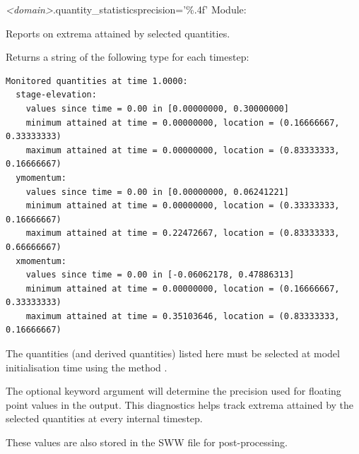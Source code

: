 \documentclass{manual}
\begin{document}
\begin{methoddesc}{\emph{<domain>}.quantity_statistics}{precision='\%.4f'}
Module: 

Reports on extrema attained by selected quantities.

Returns a string of the following type for each timestep:

\begin{verbatim}
Monitored quantities at time 1.0000:
  stage-elevation:
    values since time = 0.00 in [0.00000000, 0.30000000]
    minimum attained at time = 0.00000000, location = (0.16666667, 0.33333333)
    maximum attained at time = 0.00000000, location = (0.83333333, 0.16666667)
  ymomentum:
    values since time = 0.00 in [0.00000000, 0.06241221]
    minimum attained at time = 0.00000000, location = (0.33333333, 0.16666667)
    maximum attained at time = 0.22472667, location = (0.83333333, 0.66666667)
  xmomentum:
    values since time = 0.00 in [-0.06062178, 0.47886313]
    minimum attained at time = 0.00000000, location = (0.16666667, 0.33333333)
    maximum attained at time = 0.35103646, location = (0.83333333, 0.16666667)
\end{verbatim}

The quantities (and derived quantities) listed here must be selected at model
initialisation time using the method .

The optional keyword argument  will
determine the precision used for floating point values in the output.
This diagnostics helps track extrema attained by the selected quantities
at every internal timestep.

These values are also stored in the SWW file for post-processing.
\end{methoddesc}
\end{document}
